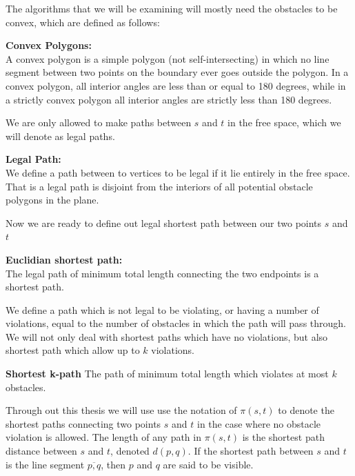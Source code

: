 The algorithms that we will be examining will mostly need the obstacles to be 
convex, which are defined as follows: 

\begin{mydef}
	\textbf{Convex Polygons:} \\ 
	A convex polygon is a simple polygon (not self-intersecting) in which no
	line segment between two points on the boundary ever goes outside the
	polygon. In a convex polygon, all interior angles are less than or equal to
	180 degrees, while in a strictly convex polygon all interior angles are
	strictly less than 180 degrees.
	\cite{Bisector-collinearity-convexPoly} 
\end{mydef}

We are only allowed to make paths between $s$ and $t$ in the free space, which we 
will denote as legal paths.

\begin{mydef}
	\textbf{Legal Path:}\\ 
	We define a path between to vertices to be
	legal if it lie entirely in the free space. That is a legal path is disjoint
	from the interiors of all potential obstacle polygons in the plane.
\end{mydef}

Now we are ready to define out legal shortest path between our two points $s$ and 
$t$

\begin{mydef}
	\textbf{Euclidian shortest path:}\\ 
	The legal path of minimum total length connecting the two endpoints is a 
    shortest path.  
\end{mydef}

We define a path which is not legal to be violating, or having a number of
violations, equal to the number of obstacles in which the path will pass
through. We will not only deal with shortest paths which have no violations,
but also shortest path which allow up to $k$ violations.

\begin{mydef}
	\textbf{Shortest k-path}
	The path of minimum total length which violates at most $k$ obstacles.
\end{mydef}

Through out this thesis we will use use the notation of $\pi(s,t)$ to denote the 
shortest paths connecting two points $s$ and $t$ in the case where no obstacle 
violation is allowed. The length of any path in	$\pi(s,t)$ is the shortest path 
distance between $s$ and $t$, denoted $d(p,q)$. If the shortest path between $s$ 
and $t$ is the line segment $\overline{p,q}$, then $p$ and $q$ are said to be 
visible. 

